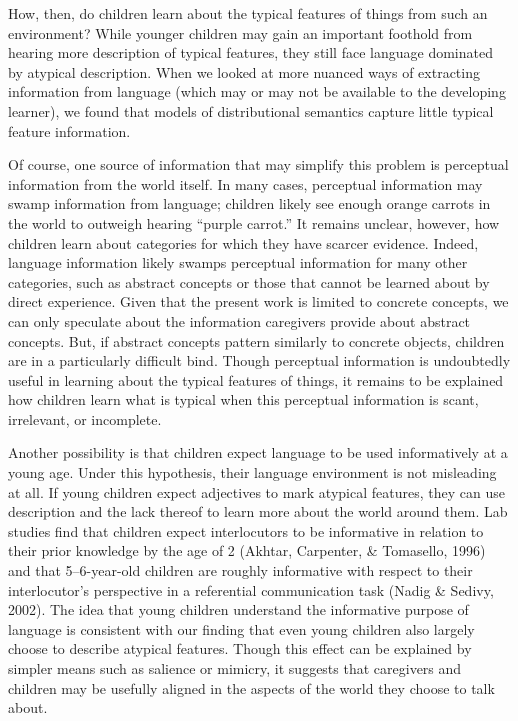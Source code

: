 \documentclass[10pt, letterpaper]{article}
\begin{document}
How, then, do children learn about the typical features of things from
such an environment? While younger children may gain an important
foothold from hearing more description of typical features, they still
face language dominated by atypical description. When we looked at more
nuanced ways of extracting information from language (which may or may
not be available to the developing learner), we found that models of
distributional semantics capture little typical feature information.

Of course, one source of information that may simplify this problem is
perceptual information from the world itself. In many cases, perceptual
information may swamp information from language; children likely see
enough orange carrots in the world to outweigh hearing ``purple
carrot.'' It remains unclear, however, how children learn about
categories for which they have scarcer evidence. Indeed, language
information likely swamps perceptual information for many other
categories, such as abstract concepts or those that cannot be learned
about by direct experience. Given that the present work is limited to
concrete concepts, we can only speculate about the information
caregivers provide about abstract concepts. But, if abstract concepts
pattern similarly to concrete objects, children are in a particularly
difficult bind. Though perceptual information is undoubtedly useful in
learning about the typical features of things, it remains to be
explained how children learn what is typical when this perceptual
information is scant, irrelevant, or incomplete.

Another possibility is that children expect language to be used
informatively at a young age. Under this hypothesis, their language
environment is not misleading at all. If young children expect
adjectives to mark atypical features, they can use description and the
lack thereof to learn more about the world around them. Lab studies find
that children expect interlocutors to be informative in relation to
their prior knowledge by the age of 2 (Akhtar, Carpenter, \& Tomasello,
1996) and that 5--6-year-old children are roughly informative with
respect to their interlocutor's perspective in a referential
communication task (Nadig \& Sedivy, 2002). The idea that young children
understand the informative purpose of language is consistent with our
finding that even young children also largely choose to describe
atypical features. Though this effect can be explained by simpler means
such as salience or mimicry, it suggests that caregivers and children
may be usefully aligned in the aspects of the world they choose to talk
about.
\end{document}
